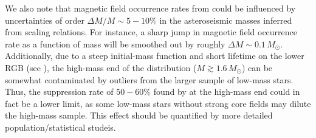 We also note that magnetic field occurrence rates from \cite{Stello_2016} could be influenced by uncertainties of order $\Delta M/M \! \sim \! 5-10 \%$ in the asteroseismic masses inferred from scaling relations. For instance, a sharp jump in magnetic field occurrence rate as a function of mass will be smoothed out by roughly $\Delta M \! \sim \! 0.1 \, M_\odot$. Additionally, due to a steep initial-mass function and short lifetime on the lower RGB (see \cite{Lloyd_2011,Lloyd_2013}), the high-mass end of the distribution ($M \gtrsim 1.6 \, M_\odot$) can be somewhat contaminated by outliers from the larger sample of low-mass stars. Thus, the suppression rate of $50-60\%$ found by \cite{Stello_2016} at the high-mass end could in fact be a lower limit, as some low-mass stars without strong core fields may dilute the high-mass sample. This effect should be quantified by more detailed population/statistical studeis.
